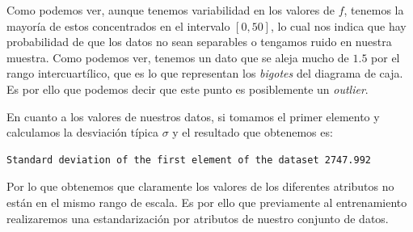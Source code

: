 \documentclass[a4paper, 20pt]{article}
\begin{document}
Como podemos ver, aunque tenemos variabilidad en los valores de $f$, tenemos la mayoría de estos concentrados en el intervalo $[0,50]$, lo cual nos indica que hay probabilidad de que los datos no sean separables o tengamos ruido en nuestra muestra. Como podemos ver, tenemos un dato que se aleja mucho de $1.5$ por el rango intercuartílico, que es lo que representan los \emph{bigotes} del diagrama de caja. Es por ello que podemos decir que este punto es posiblemente un \emph{outlier}.

En cuanto a los valores de nuestros datos, si tomamos el primer elemento y calculamos la desviación típica $\sigma$ y el resultado que obtenemos es:
\begin{lstlisting}[lang = Python]
  Standard deviation of the first element of the dataset 2747.992
\end{lstlisting}
Por lo que obtenemos que claramente los valores de los diferentes atributos no están en el mismo rango de escala. Es por ello que previamente al entrenamiento realizaremos una estandarización por atributos de nuestro conjunto de datos.

\newpage
\printbibliography
\end{document}
